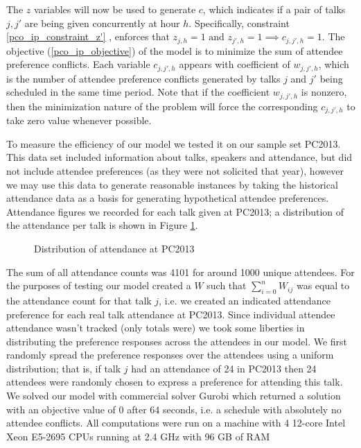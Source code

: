 \documentclass{svjour3}                     %
\begin{document}
The $z$ variables will now be used to generate $c$, which indicates if a pair of talks $j,j'$ are being given concurrently at hour $h$. 
Specifically, constraint \eqref{pco_ip_constraint_z'} , enforces that $z_{j,h} = 1 \text{ and } z_{j',h} = 1 \implies c_{j,j',h}=1$. 
The objective (\ref{pco_ip_objective}) of the model is to minimize the sum of attendee preference conflicts.
Each variable $c_{j,j',h}$ appears with coefficient of $w_{j,j',h}$, which is the number of attendee preference conflicts generated by talks $j$ and $j'$ being scheduled in the same time period.
Note that if the coefficient $w_{j,j',h}$ is nonzero, then the minimization nature of the problem will force the corresponding $c_{j,j',h}$ to take zero value whenever possible.

To measure the efficiency of our model we tested it on our sample set PC2013. 
This data set included information about talks, speakers and attendance, but did not include attendee preferences (as they were not solicited that year), however we may use this data to generate reasonable instances by taking the historical attendance data as a basis for generating hypothetical attendee preferences.
Attendance figures we recorded for each talk given at PC2013; a distribution of the attendance per talk is shown in Figure \ref{2013_attendance_distribution}.
\begin{figure}[h!]
	\caption{Distribution of attendance at PC2013}
	\centering
	
	\label{2013_attendance_distribution}
\end{figure}
The sum of all attendance counts was 4101 \cite{pc2013_attendance} for around 1000 unique attendees. 
For the purposes of testing our model created a $W$ such that $\sum\limits_{i=0}^{n} W_{ij}$ was equal to the attendance count for that talk $j$, i.e. we created an indicated attendance preference for each real talk attendance at PC2013. 
Since individual attendee attendance wasn't tracked (only totals were) we took some liberties in distributing the preference responses across the attendees in our model. 
We first randomly spread the preference responses over the attendees using a uniform distribution; that is, if talk $j$ had an attendance of 24 in PC2013 then 24 attendees were randomly chosen to express a preference for attending this talk. 
We solved our model with commercial solver Gurobi which returned a solution with an objective value of 0 after 64 seconds, i.e. a schedule with absolutely no attendee conflicts.
All computations were run on a machine with 4 12-core Intel Xeon E5-2695 CPUs running at 2.4 GHz with 96 GB of RAM
\end{document}
